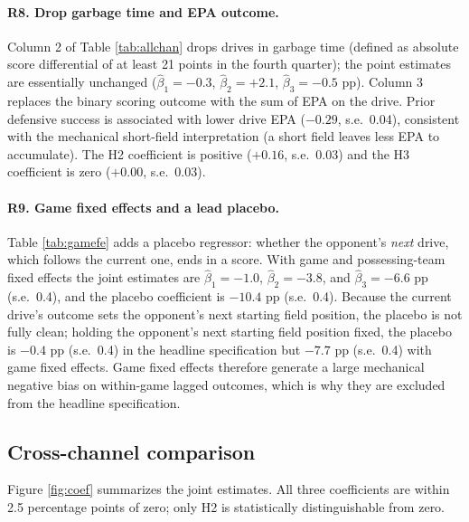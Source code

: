 \documentclass[11pt]{article}
\begin{document}
\paragraph{R8. Drop garbage time and EPA outcome.} Column 2 of Table
\ref{tab:allchan} drops drives in garbage time (defined as absolute score
differential of at least 21 points in the fourth quarter); the point
estimates are essentially unchanged ($\hat\beta_1 = -0.3$, $\hat\beta_2 =
+2.1$, $\hat\beta_3 = -0.5$ pp). Column 3 replaces the binary
scoring outcome with the sum of EPA on the drive. Prior
defensive success is associated with lower drive EPA ($-0.29$, s.e.\ 0.04),
consistent with the mechanical short-field interpretation (a short field
leaves less EPA to accumulate). The H2 coefficient is positive ($+0.16$,
s.e.\ 0.03) and the H3 coefficient is zero ($+0.00$, s.e.\ 0.03).

\paragraph{R9. Game fixed effects and a lead placebo.}\label{sec:gamefe}
Table \ref{tab:gamefe} adds a placebo regressor: whether the opponent's
\emph{next} drive, which follows the current one, ends in a score. With
game and possessing-team fixed effects the joint estimates are
$\hat\beta_1 = -1.0$, $\hat\beta_2 = -3.8$, and $\hat\beta_3 = -6.6$ pp
(s.e.\ 0.4), and the placebo coefficient is $-10.4$ pp (s.e.\ 0.4). Because
the current drive's outcome sets the opponent's next starting field
position, the placebo is not fully clean; holding the opponent's next
starting field position fixed, the placebo is $-0.4$ pp (s.e.\ 0.4) in the
headline specification but $-7.7$ pp (s.e.\ 0.4) with game fixed effects.
Game fixed effects therefore generate a large mechanical negative bias on
within-game lagged outcomes, which is why they are excluded from the
headline specification.



\subsection{Cross-channel comparison}

Figure \ref{fig:coef} summarizes the joint estimates. All three
coefficients are within 2.5 percentage points of zero; only H2 is
statistically distinguishable from zero.
\end{document}

